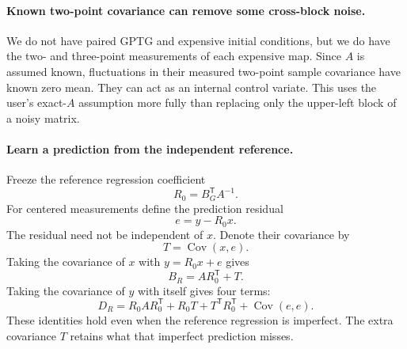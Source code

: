 \documentclass[11pt]{article}
\newcommand{\cov}{\operatorname{Cov}}
\begin{document}
\paragraph{Known two-point covariance can remove some cross-block noise.}
We do not have paired GPTG and expensive initial conditions, but we do have
the two- and three-point measurements of each expensive map. Since $A$ is
assumed known, fluctuations in their measured two-point sample covariance
have known zero mean. They can act as an internal control variate. This
uses the user's exact-$A$ assumption more fully than replacing only the
upper-left block of a noisy matrix.

\paragraph{Learn a prediction from the independent reference.}
Freeze the reference regression coefficient
\begin{equation}
 R_0=B_G^{\mathsf T}A^{-1}.
\end{equation}
For centered measurements define the prediction residual
\begin{equation}
 e=y-R_0x.
\end{equation}
The residual need not be independent of $x$. Denote their covariance by
\begin{equation}
 T=\cov(x,e).
\end{equation}
Taking the covariance of $x$ with $y=R_0x+e$ gives
\begin{equation}
 B_R=AR_0^{\mathsf T}+T.
\end{equation}
Taking the covariance of $y$ with itself gives four terms:
\begin{equation}
 D_R=R_0AR_0^{\mathsf T}+R_0T+T^{\mathsf T}R_0^{\mathsf T}+\cov(e,e).
\end{equation}
These identities hold even when the reference regression is imperfect.
The extra covariance $T$ retains what that imperfect prediction misses.
\end{document}
